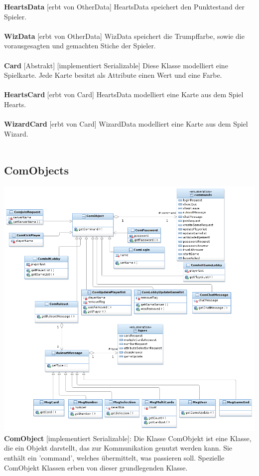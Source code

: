 \documentclass{article}
\begin{document}
\textbf{HeartsData} [erbt von OtherData] HeartsData speichert den Punktestand der Spieler. \\ \\
		
\textbf{WizData} [erbt von OtherData] WizData speichert die Trumpffarbe, sowie die vorausgesagten und gemachten Stiche der Spieler. \\ \\
		
\textbf{Card} [Abstrakt] [implementiert Serializable] Diese Klasse modelliert eine Spielkarte. Jede Karte besitzt als Attribute einen Wert und eine Farbe. \\ \\
		
\textbf{HeartsCard} [erbt von Card]  HeartsData modelliert eine Karte aus dem Spiel Hearts. \\ \\
		
\textbf{WizardCard} [erbt von Card] WizardData modelliert eine Karte aus dem Spiel Wizard. \\ \\

\subsection{ComObjects}
\includegraphics[width=\textwidth]{Entwurf_ComDiagram_1}
\textbf{ComObject} [implementiert Serializable]: Die Klasse ComObjekt ist eine Klasse, die ein Objekt darstellt, das zur Kommunikation genutzt werden kann. Sie enthält ein 'command', welches übermittelt, was passieren soll. Spezielle ComObjekt Klassen erben von dieser grundlegenden Klasse.\\
\end{document}
